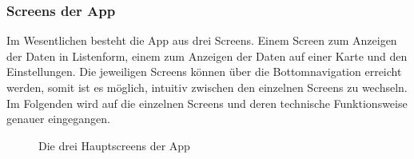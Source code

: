 \subsubsection{Screens der App}\label{screens der app}
Im Wesentlichen besteht die App aus drei Screens. Einem Screen zum Anzeigen der Daten in Listenform, 
einem zum Anzeigen der Daten auf einer Karte und den Einstellungen. 
Die jeweiligen Screens können über die Bottomnavigation erreicht werden, somit ist es möglich, intuitiv zwischen den einzelnen 
Screens zu wechseln.
Im Folgenden wird auf die einzelnen Screens und deren technische Funktionsweise genauer eingegangen.
\begin{figure}[H]
    \centering
    \caption{Die drei Hauptscreens der App}
\end{figure}

